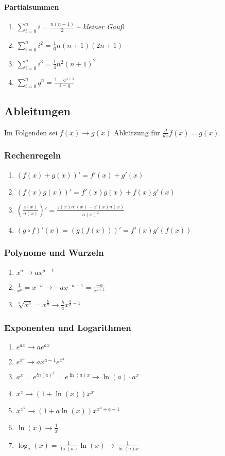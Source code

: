 \documentclass[a4paper, 9pt, DIV=24]{scrartcl}
\begin{document}
\paragraph{Partialsummen}
\begin{enumerate}[label={(}\arabic*{)}]
 \item $\sum_{i=0}^n i = \frac{n(n-1)}{2}$ -- \emph{kleiner Gauß}
 \item $\sum_{i=0}^n i^2 = \frac{1}{6}n(n+1)(2n+1)$
 \item $\sum_{i=0}^n i^3 = \frac{1}{4}n^2(n+1)^2$
 \item $\sum_{i=0}^n q^n = \frac{1-q^{n+1}}{1-q}$
\end{enumerate}

\clearpage

\subsection{Ableitungen}
Im Folgenden sei $f(x) \rightarrow g(x)$ Abkürzung für $\frac{d}{dx} f(x) = g(x)$.
\subsubsection{Rechenregeln}
\begin{enumerate}[label={(}\arabic*{)}]
 \item $(f(x)+g(x))' = f'(x) + g'(x)$
 \item $(f(x)g(x))' = f'(x)g(x) + f(x)g'(x)$
 \item $(\frac{z(x)}{n(x)})' = \frac{z(x)n'(x) - z'(x)n(x)}{n(x)^2}$
 \item $(g \circ f)'(x) = (g(f(x)))' = f'(x)g'(f(x))$
\end{enumerate}
\subsubsection{Polynome und Wurzeln}
\begin{enumerate}[label={(}\arabic*{)}]
 \item $x^a \rightarrow ax^{a-1}$
 \item $\frac{1}{x^a} = x^{-a} \rightarrow -ax^{-a-1} = \frac{-a}{x^{a+1}}$
 \item $\sqrt[a]{x^b} = x^{\frac{b}{a}} \rightarrow \frac{b}{a}x^{\frac{b}{a}-1}$
\end{enumerate}
\subsubsection{Exponenten und Logarithmen}
\begin{enumerate}[label={(}\arabic*{)}]
 \item $e^{ax} \rightarrow ae^{ax}$
 \item $e^{x^{a}} \rightarrow ax^{a-1}e^{x^{a}}$
 \item $a^{x} = e^{ln(a)^{x}} = e^{\ln(a)x} \rightarrow \ln(a)\cdot a^x$
 \item $x^{x} \rightarrow (1+\ln(x))x^{x}$
 \item $x^{x^a} \rightarrow (1+a\ln(x))x^{x^a+a-1}$
 \item $\ln(x) \rightarrow \frac{1}{x}$
 \item $\log_a(x) = \frac{1}{\ln(a)}\ln(x) \rightarrow \frac{1}{\ln(a)x}$
\end{enumerate}
\end{document}

